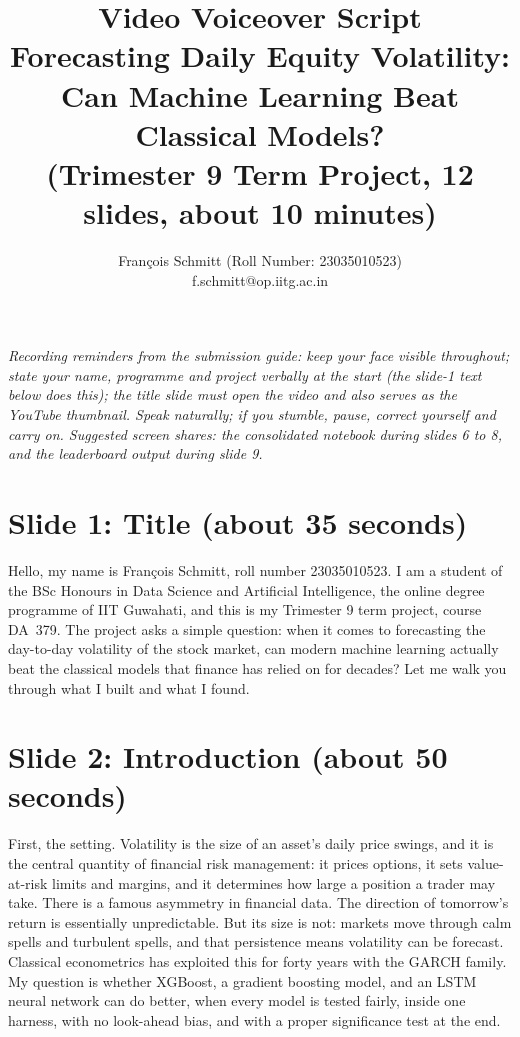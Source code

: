 \documentclass[a4paper,11pt]{article}
\title{\bfseries Video Voiceover Script\\
\large Forecasting Daily Equity Volatility: Can Machine Learning Beat Classical Models?\\
(Trimester 9 Term Project, 12 slides, about 10 minutes)}
\author{François Schmitt (Roll Number: 23035010523)\\
\ttfamily f.schmitt@op.iitg.ac.in}
\date{}
\begin{document}
\maketitle

\noindent\textit{Recording reminders from the submission guide: keep your face visible throughout; state your name, programme and project verbally at the start (the slide-1 text below does this); the title slide must open the video and also serves as the YouTube thumbnail. Speak naturally; if you stumble, pause, correct yourself and carry on. Suggested screen shares: the consolidated notebook during slides 6 to 8, and the leaderboard output during slide 9.}

\section*{Slide 1: Title (about 35 seconds)}

Hello, my name is François Schmitt, roll number 23035010523. I am a student of the BSc Honours in Data Science and Artificial Intelligence, the online degree programme of IIT Guwahati, and this is my Trimester 9 term project, course DA~379. The project asks a simple question: when it comes to forecasting the day-to-day volatility of the stock market, can modern machine learning actually beat the classical models that finance has relied on for decades? Let me walk you through what I built and what I found.

\section*{Slide 2: Introduction (about 50 seconds)}

First, the setting. Volatility is the size of an asset's daily price swings, and it is the central quantity of financial risk management: it prices options, it sets value-at-risk limits and margins, and it determines how large a position a trader may take. There is a famous asymmetry in financial data. The direction of tomorrow's return is essentially unpredictable. But its size is not: markets move through calm spells and turbulent spells, and that persistence means volatility can be forecast. Classical econometrics has exploited this for forty years with the GARCH family. My question is whether XGBoost, a gradient boosting model, and an LSTM neural network can do better, when every model is tested fairly, inside one harness, with no look-ahead bias, and with a proper significance test at the end.
\end{document}
